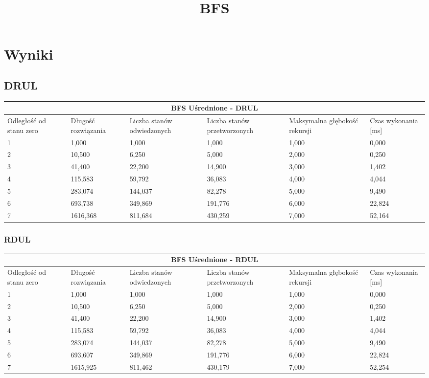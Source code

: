 \documentclass{classrep}
\begin{document}
\section{Wyniki}
{
\begin{center}
	\title{\textbf{BFS}}
\end{center}
\subsection{DRUL}
\begin{center}
	\begin{tabular}{ | p{1.6cm} | p{1.4cm} | p{1.8cm} | p{2cm} | p{2.2cm} | p{2cm} | }
	\hline
	\multicolumn{6}{|c|}{BFS Uśrednione - DRUL} \\
	\hline
	Odległość od stanu zero & Długość rozwiązania & Liczba stanów odwiedzonych & Liczba stanów przetworzonych & Maksymalna głębokość rekursji & Czas wykonania [ms]\\
	\hline
	1 & 1,000 & 1,000 & 1,000 & 1,000 & 0,000 \\
	\hline
	2 & 10,500 & 6,250 & 5,000 & 2,000& 0,250 \\
	\hline
	3 & 41,400&	22,200& 14,900& 3,000 & 1,402 \\
	\hline
	4 & 115,583 & 59,792 & 36,083 & 4,000 & 4,044 \\
	\hline
	5 & 283,074 & 144,037 &	82,278 & 5,000 & 9,490 \\
	\hline
	6 & 693,738 & 349,869 & 191,776 & 6,000 &22,824 \\
	\hline
	7 & 1616,368 & 811,684 & 430,259 & 7,000& 52,164 \\
	\hline
	\end{tabular}
\end{center}

\subsubsection{RDUL}
\begin{center}
	\begin{tabular}{ | p{1.6cm} | p{1.4cm} | p{1.8cm} | p{2cm} | p{2.2cm} | p{2cm} | }
	\hline
	\multicolumn{6}{|c|}{BFS Uśrednione - RDUL} \\
	\hline
	Odległość od stanu zero & Długość rozwiązania & Liczba stanów odwiedzonych & Liczba stanów przetworzonych & Maksymalna głębokość rekursji & Czas wykonania [ms]\\
	\hline
	1 & 1,000 & 1,000 & 1,000 & 1,000 & 0,000 \\
	\hline
	2 & 10,500 & 6,250 & 5,000 & 2,000& 0,250 \\
	\hline
	3 & 41,400&	22,200& 14,900& 3,000 & 1,402 \\
	\hline
	4 & 115,583 & 59,792 & 36,083 & 4,000 & 4,044 \\
	\hline
	5 & 283,074 & 144,037 &	82,278 & 5,000 & 9,490 \\
	\hline
	6 & 693,607 & 349,869 & 191,776 & 6,000 & 22,824 \\
	\hline
	7 & 1615,925 & 811,462 & 430,179 & 7,000& 52,254 \\
	\hline
	\end{tabular}
\end{center}

}
\end{document}
